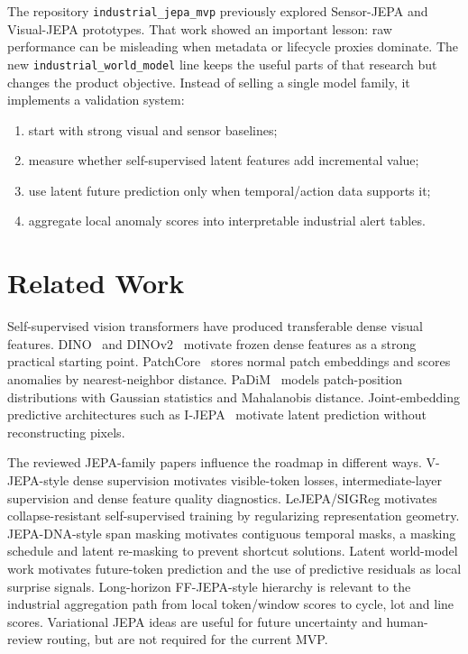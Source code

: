\documentclass[10pt,conference]{IEEEtran}
\begin{document}
The repository \texttt{industrial\_jepa\_mvp} previously explored Sensor-JEPA and Visual-JEPA prototypes. That work showed an important lesson: raw performance can be misleading when metadata or lifecycle proxies dominate. The new \texttt{industrial\_world\_model} line keeps the useful parts of that research but changes the product objective. Instead of selling a single model family, it implements a validation system:
\begin{enumerate}
  \item start with strong visual and sensor baselines;
  \item measure whether self-supervised latent features add incremental value;
  \item use latent future prediction only when temporal/action data supports it;
  \item aggregate local anomaly scores into interpretable industrial alert tables.
\end{enumerate}

\section{Related Work}
Self-supervised vision transformers have produced transferable dense visual features. DINO~\cite{caron2021dino} and DINOv2~\cite{oquab2023dinov2} motivate frozen dense features as a strong practical starting point. PatchCore~\cite{roth2022patchcore} stores normal patch embeddings and scores anomalies by nearest-neighbor distance. PaDiM~\cite{defard2021padim} models patch-position distributions with Gaussian statistics and Mahalanobis distance. Joint-embedding predictive architectures such as I-JEPA~\cite{assran2023ijepa} motivate latent prediction without reconstructing pixels.

The reviewed JEPA-family papers influence the roadmap in different ways. V-JEPA-style dense supervision motivates visible-token losses, intermediate-layer supervision and dense feature quality diagnostics. LeJEPA/SIGReg motivates collapse-resistant self-supervised training by regularizing representation geometry. JEPA-DNA-style span masking motivates contiguous temporal masks, a masking schedule and latent re-masking to prevent shortcut solutions. Latent world-model work motivates future-token prediction and the use of predictive residuals as local surprise signals. Long-horizon FF-JEPA-style hierarchy is relevant to the industrial aggregation path from local token/window scores to cycle, lot and line scores. Variational JEPA ideas are useful for future uncertainty and human-review routing, but are not required for the current MVP.
\end{document}

